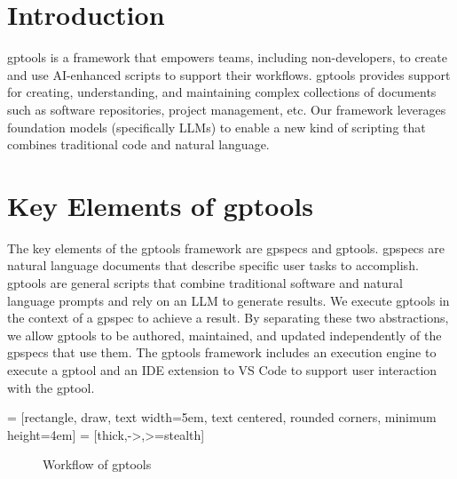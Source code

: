 
\section{Introduction}

gptools is a framework that empowers teams, including non-developers, to create and use AI-enhanced scripts to support their workflows. gptools provides support for creating, understanding, and maintaining complex collections of documents such as software repositories, project management, etc. Our framework leverages foundation models (specifically LLMs) to enable a new kind of scripting that combines traditional code and natural language.

\section{Key Elements of gptools}

The key elements of the gptools framework are gpspecs and gptools. gpspecs are natural language documents that describe specific user tasks to accomplish. gptools are general scripts that combine traditional software and natural language prompts and rely on an LLM to generate results. We execute gptools in the context of a gpspec to achieve a result. By separating these two abstractions, we allow gptools to be authored, maintained, and updated independently of the gpspecs that use them. The gptools framework includes an execution engine to execute a gptool and an IDE extension to VS Code to support user interaction with the gptool.

 = [rectangle, draw, text width=5em, text centered, rounded corners, minimum height=4em]
 = [thick,->,>=stealth]

\begin{figure}[h]
\centering
{}
\caption{Workflow of gptools}
\end{figure}


